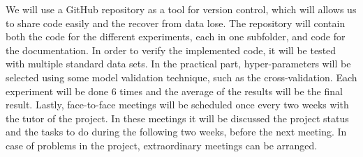 We will use a GitHub repository as a tool for version control, which will allows us to share code easily and the recover from data lose. The repository will contain both the code for the different experiments, each in one subfolder, and code for the documentation. In order to verify the implemented code, it will be tested with multiple standard data sets. In the practical part, hyper-parameters will be selected using some model validation technique, such as the cross-validation. Each ex\-per\-i\-ment will be done 6 times and the average of the results will be the final result. Lastly, face-to-face meetings will be scheduled once every two weeks with the tutor of the project. In these meetings it will be discussed the project status and the tasks to do during the following two weeks, before the next meeting. In case of problems in the project, extraordinary meetings can be arranged.
